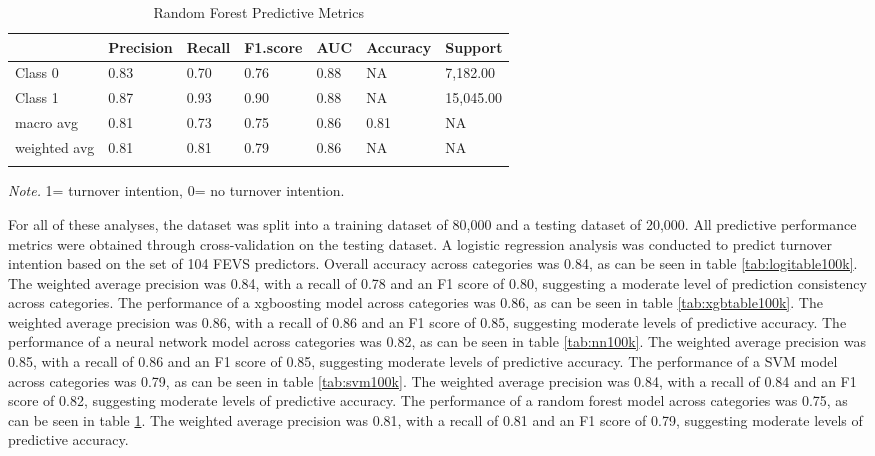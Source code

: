 \documentclass[
  man]{apa7}
\begin{document}
\begin{table}[tbp]

\begin{center}
\begin{threeparttable}

\caption{\label{tab:rf100k}Random Forest Predictive Metrics}

\begin{tabular}{lllllll}
\toprule
 & \multicolumn{1}{c}{Precision} & \multicolumn{1}{c}{Recall} & \multicolumn{1}{c}{F1.score} & \multicolumn{1}{c}{AUC} & \multicolumn{1}{c}{Accuracy} & \multicolumn{1}{c}{Support}\\
\midrule
Class 0 & 0.83 & 0.70 & 0.76 & 0.88 & NA & 7,182.00\\
Class 1 & 0.87 & 0.93 & 0.90 & 0.88 & NA & 15,045.00\\
macro avg & 0.81 & 0.73 & 0.75 & 0.86 & 0.81 & NA\\
weighted avg & 0.81 & 0.81 & 0.79 & 0.86 & NA & NA\\
\bottomrule
\addlinespace
\end{tabular}

\begin{tablenotes}[para]
\normalsize{\textit{Note.} 1= turnover intention, 0= no turnover intention.}
\end{tablenotes}

\end{threeparttable}
\end{center}

\end{table}

For all of these analyses, the dataset was split into a training dataset of 80,000 and a testing dataset of 20,000. All predictive performance metrics were obtained through cross-validation on the testing dataset. A logistic regression analysis was conducted to predict turnover intention based on the set of 104 FEVS predictors. Overall accuracy across categories was 0.84, as can be seen in table \ref{tab:logitable100k}. The weighted average precision was 0.84, with a recall of 0.78 and an F1 score of 0.80, suggesting a moderate level of prediction consistency across categories.
The performance of a xgboosting model across categories was 0.86, as can be seen in table \ref{tab:xgbtable100k}. The weighted average precision was 0.86, with a recall of 0.86 and an F1 score of 0.85, suggesting moderate levels of predictive accuracy.
The performance of a neural network model across categories was 0.82, as can be seen in table \ref{tab:nn100k}. The weighted average precision was 0.85, with a recall of 0.86 and an F1 score of 0.85, suggesting moderate levels of predictive accuracy.
The performance of a SVM model across categories was 0.79, as can be seen in table \ref{tab:svm100k}. The weighted average precision was 0.84, with a recall of 0.84 and an F1 score of 0.82, suggesting moderate levels of predictive accuracy.
The performance of a random forest model across categories was 0.75, as can be seen in table \ref{tab:rf100k}. The weighted average precision was 0.81, with a recall of 0.81 and an F1 score of 0.79, suggesting moderate levels of predictive accuracy.
\end{document}

